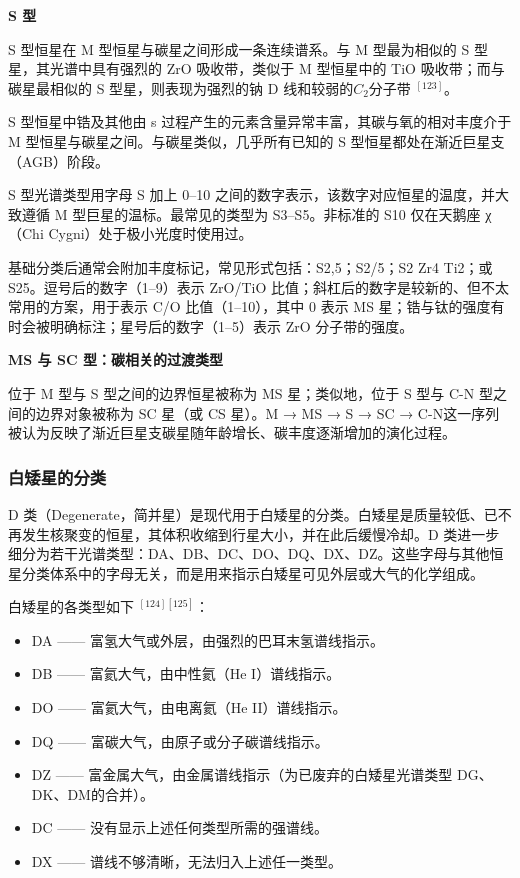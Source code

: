 \textbf{S 型}

S 型恒星在 M 型恒星与碳星之间形成一条连续谱系。与 M 型最为相似的 S 型星，其光谱中具有强烈的 ZrO 吸收带，类似于 M 型恒星中的 TiO 吸收带；而与碳星最相似的 S 型星，则表现为强烈的钠 D 线和较弱的$C{_2}$分子带 $^{[123]}$。

S 型恒星中锆及其他由 s 过程产生的元素含量异常丰富，其碳与氧的相对丰度介于 M 型恒星与碳星之间。与碳星类似，几乎所有已知的 S 型恒星都处在渐近巨星支（AGB）阶段。

S 型光谱类型用字母 S 加上 0–10 之间的数字表示，该数字对应恒星的温度，并大致遵循 M 型巨星的温标。最常见的类型为 S3–S5。非标准的 S10 仅在天鹅座 χ（Chi Cygni）处于极小光度时使用过。

基础分类后通常会附加丰度标记，常见形式包括：S2,5；S2/5；S2 Zr4 Ti2；或 S25。逗号后的数字（1–9）表示 ZrO/TiO 比值；斜杠后的数字是较新的、但不太常用的方案，用于表示 C/O 比值（1–10），其中 0 表示 MS 星；锆与钛的强度有时会被明确标注；星号后的数字（1–5）表示 ZrO 分子带的强度。

\textbf{MS 与 SC 型：碳相关的过渡类型}

位于 M 型与 S 型之间的边界恒星被称为 MS 星；类似地，位于 S 型与 C-N 型之间的边界对象被称为 SC 星（或 CS 星）。M → MS → S → SC → C-N这一序列被认为反映了渐近巨星支碳星随年龄增长、碳丰度逐渐增加的演化过程。
\subsubsection{白矮星的分类}
D 类（Degenerate，简并星）是现代用于白矮星的分类。白矮星是质量较低、已不再发生核聚变的恒星，其体积收缩到行星大小，并在此后缓慢冷却。D 类进一步细分为若干光谱类型：DA、DB、DC、DO、DQ、DX、DZ。这些字母与其他恒星分类体系中的字母无关，而是用来指示白矮星可见外层或大气的化学组成。

白矮星的各类型如下 $^{[124][125]}$：

\begin{itemize}
\item DA —— 富氢大气或外层，由强烈的巴耳末氢谱线指示。
\item DB —— 富氦大气，由中性氦（He I）谱线指示。
\item DO —— 富氦大气，由电离氦（He II）谱线指示。
\item DQ —— 富碳大气，由原子或分子碳谱线指示。
\item DZ —— 富金属大气，由金属谱线指示（为已废弃的白矮星光谱类型 DG、DK、DM的合并）。
\item DC —— 没有显示上述任何类型所需的强谱线。
\item DX —— 谱线不够清晰，无法归入上述任一类型。
\end{itemize}

